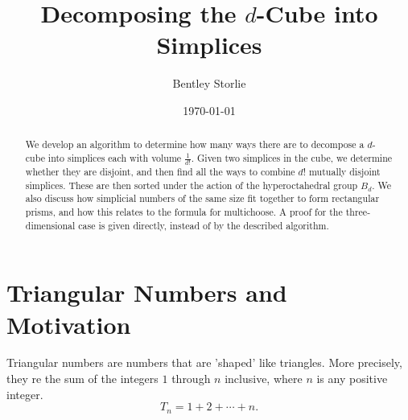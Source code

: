 \documentclass[12pt]{scrippsthesis}
\title{Decomposing the $d$-Cube into Simplices}
\author{Bentley Storlie}
\date{\today}
\newcommand{\mchoose}[2]{{\textstyle \left( \! {#1 \choose #2} \! \right)}}
\newcommand{\N}{\mathbb{N}}
\theoremstyle{definition}
\theoremstyle{remark}
\theoremstyle{plain}
\begin{document}
\parindent=0pt

\maketitle
\tableofcontents
\listoffigures


\begin{abstract}

We develop an algorithm to determine how many ways there are to decompose a $d$-cube into simplices each with volume $\frac{1}{d!}$.  Given two simplices in the cube, we determine whether they are disjoint, and then find all the ways to combine $d!$ mutually disjoint simplices.  These are then sorted under the action of the hyperoctahedral group $B_d$.  We also discuss how simplicial numbers of the same size fit together to form rectangular prisms, and how this relates to the formula for multichoose.  A proof for the three-dimensional case is given directly, instead of by the described algorithm. 

\end{abstract}


\chapter{Triangular Numbers and Motivation}


%


Triangular numbers are numbers that are 'shaped' like triangles.  More precisely, they re the sum of the integers $1$ through $n$ inclusive, where $n$ is any positive integer.
\begin{equation}T_n = 1 + 2 + \dotsb + n. \end{equation}
\end{document}
